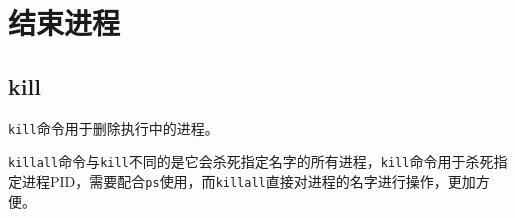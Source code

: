 \documentclass[12pt, openany, oneside]{book}
\begin{document}
\newpage

\section{结束进程}

\subsection{kill}

\lstinline|kill|命令用于删除执行中的进程。

\begin{table}[H]
    \centering
    \caption{\lstinline|kill|参数说明}
\end{table}

\lstinline|killall|命令与\lstinline|kill|不同的是它会杀死指定名字的所有进程，\lstinline|kill|命令用于杀死指定进程PID，需要配合\lstinline|ps|使用，而\lstinline|killall|直接对进程的名字进行操作，更加方便。
\end{document}

